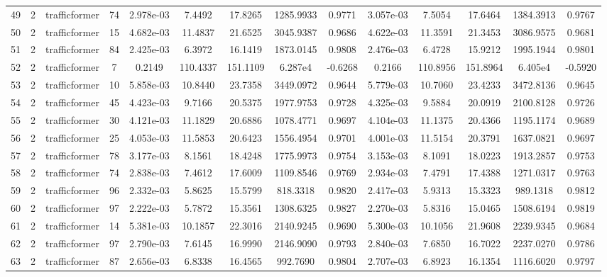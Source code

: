 \begin{landscape}
\begin{longtable}{c | c | c | c | c | c | c | c | c | c | c | c | c | c}
	49 & 2 & trafficformer & 74 & 2.978e-03 & 7.4492 & 17.8265 & 1285.9933 & 0.9771 & 3.057e-03 & 7.5054 & 17.6464 & 1384.3913 & 0.9767 \\
	50 & 2 & trafficformer & 15 & 4.682e-03 & 11.4837 & 21.6525 & 3045.9387 & 0.9686 & 4.622e-03 & 11.3591 & 21.3453 & 3086.9575 & 0.9681 \\
	51 & 2 & trafficformer & 84 & 2.425e-03 & 6.3972 & 16.1419 & 1873.0145 & 0.9808 & 2.476e-03 & 6.4728 & 15.9212 & 1995.1944 & 0.9801 \\
	52 & 2 & trafficformer & 7 & 0.2149 & 110.4337 & 151.1109 & 6.287e4 & -0.6268 & 0.2166 & 110.8956 & 151.8964 & 6.405e4 & -0.5920 \\
	53 & 2 & trafficformer & 10 & 5.858e-03 & 10.8440 & 23.7358 & 3449.0972 & 0.9644 & 5.779e-03 & 10.7060 & 23.4233 & 3472.8136 & 0.9645 \\
	54 & 2 & trafficformer & 45 & 4.423e-03 & 9.7166 & 20.5375 & 1977.9753 & 0.9728 & 4.325e-03 & 9.5884 & 20.0919 & 2100.8128 & 0.9726 \\
	55 & 2 & trafficformer & 30 & 4.121e-03 & 11.1829 & 20.6886 & 1078.4771 & 0.9697 & 4.104e-03 & 11.1375 & 20.4366 & 1195.1174 & 0.9689 \\
	56 & 2 & trafficformer & 25 & 4.053e-03 & 11.5853 & 20.6423 & 1556.4954 & 0.9701 & 4.001e-03 & 11.5154 & 20.3791 & 1637.0821 & 0.9697 \\
	57 & 2 & trafficformer & 78 & 3.177e-03 & 8.1561 & 18.4248 & 1775.9973 & 0.9754 & 3.153e-03 & 8.1091 & 18.0223 & 1913.2857 & 0.9753 \\
	58 & 2 & trafficformer & 74 & 2.838e-03 & 7.4612 & 17.6009 & 1109.8546 & 0.9769 & 2.934e-03 & 7.4791 & 17.4388 & 1271.0317 & 0.9763 \\
	59 & 2 & trafficformer & 96 & 2.332e-03 & 5.8625 & 15.5799 & 818.3318 & 0.9820 & 2.417e-03 & 5.9313 & 15.3323 & 989.1318 & 0.9812 \\
	60 & 2 & trafficformer & 97 & 2.222e-03 & 5.7872 & 15.3561 & 1308.6325 & 0.9827 & 2.270e-03 & 5.8316 & 15.0465 & 1508.6194 & 0.9819 \\
	61 & 2 & trafficformer & 14 & 5.381e-03 & 10.1857 & 22.3016 & 2140.9245 & 0.9690 & 5.300e-03 & 10.1056 & 21.9608 & 2239.9345 & 0.9684 \\
	62 & 2 & trafficformer & 97 & 2.790e-03 & 7.6145 & 16.9990 & 2146.9090 & 0.9793 & 2.840e-03 & 7.6850 & 16.7022 & 2237.0270 & 0.9786 \\
	63 & 2 & trafficformer & 87 & 2.656e-03 & 6.8338 & 16.4565 & 992.7690 & 0.9804 & 2.707e-03 & 6.8923 & 16.1354 & 1116.6020 & 0.9797 \\

\end{longtable}
\end{landscape}
